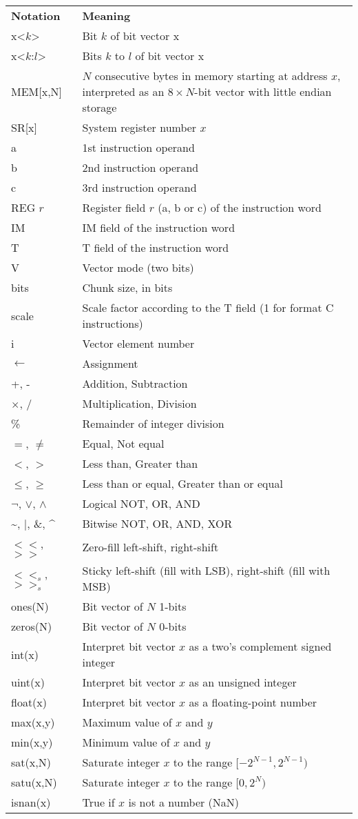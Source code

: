 \begin{tabular}{lp{400pt}}
\textbf{Notation} & \textbf{Meaning} \\
x<$k$> & Bit $k$ of bit vector x \\
x<$k$:$l$> & Bits $k$ to $l$ of bit vector x \\
MEM[x,N] & $N$ consecutive bytes in memory starting at address $x$, interpreted as an $8\times N$-bit vector with little endian storage \\
SR[x] & System register number $x$ \\
a & 1st instruction operand \\
b & 2nd instruction operand \\
c & 3rd instruction operand \\
REG $r$ & Register field $r$ (a, b or c) of the instruction word \\
IM & IM field of the instruction word \\
T & T field of the instruction word \\
V & Vector mode (two bits) \\
bits & Chunk size, in bits \\
scale & Scale factor according to the T field (1 for format C instructions) \\
i & Vector element number \\
$\leftarrow$ & Assignment \\
+, - & Addition, Subtraction \\
$\times$, / & Multiplication, Division \\
\% & Remainder of integer division \\
$=$, $\neq$ & Equal, Not equal \\
$<$, $>$ & Less than, Greater than \\
$\leq$, $\geq$ & Less than or equal, Greater than or equal \\
$\neg$, $\vee$, $\wedge$ & Logical NOT, OR, AND \\
\textasciitilde, $|$, \&, \textasciicircum & Bitwise NOT, OR, AND, XOR \\
$<<$, $>>$ & Zero-fill left-shift, right-shift \\
$<<_{s}$, $>>_{s}$ & Sticky left-shift (fill with LSB), right-shift (fill with MSB) \\
ones(N) & Bit vector of $N$ 1-bits \\
zeros(N) & Bit vector of $N$ 0-bits \\
int(x) & Interpret bit vector $x$ as a two's complement signed integer \\
uint(x) & Interpret bit vector $x$ as an unsigned integer \\
float(x) & Interpret bit vector $x$ as a floating-point number \\
max(x,y) & Maximum value of $x$ and $y$ \\
min(x,y) & Minimum value of $x$ and $y$ \\
sat(x,N) & Saturate integer $x$ to the range $[-2^{N-1},2^{N-1})$ \\
satu(x,N) & Saturate integer $x$ to the range $[0,2^{N})$ \\
isnan(x) & True if $x$ is not a number (NaN) \\
\end{tabular}

\clearpage


